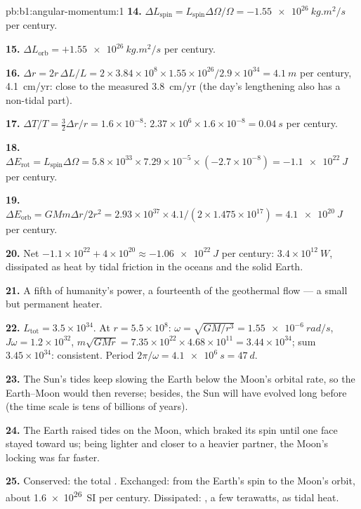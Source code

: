 \begin{solution}{pb:b1:angular-momentum:1}
\textbf{14.} $\Delta L_{\text{spin}} = L_{\text{spin}}\Delta\Omega/\Omega =
\qty{-1.55e26}{kg.m^2/s}$ per century.

\textbf{15.} $\Delta L_{\text{orb}} = +\qty{1.55e26}{kg.m^2/s}$ per century.

\textbf{16.} $\Delta r = 2r\,\Delta L/L = 2 \times 3.84\times10^8 \times 1.55
\times10^{26}/2.9\times10^{34} = \qty{4.1}{m}$ per century, \qty{4.1}{cm/yr}:
close to the measured \qty{3.8}{cm/yr} (the day's lengthening also has
a non-tidal part).

\textbf{17.} $\Delta T/T = \tfrac32\Delta r/r = 1.6\times10^{-8}$: $2.37\times
10^6 \times 1.6\times10^{-8} = \qty{0.04}{s}$ per century.

\textbf{18.} $\Delta E_{\text{rot}} = L_{\text{spin}}\Delta\Omega = 5.8\times10^{33}
\times 7.29\times10^{-5} \times (-2.7\times10^{-8}) = \qty{-1.1e22}{J}$ per
century.

\textbf{19.} $\Delta E_{\text{orb}} = GMm\Delta r/2r^2 = 2.93\times10^{37}
\times 4.1/(2 \times 1.475\times10^{17}) = \qty{+4.1e20}{J}$ per century.

\textbf{20.} Net $-1.1\times10^{22} + 4\times10^{20} \approx \qty{-1.06e22}{J}$
per century: $3.4\times10^{12}\ \unit{W}$, dissipated as heat by tidal
friction in the oceans and the solid Earth.

\textbf{21.} A fifth of humanity's power, a fourteenth of the geothermal
flow --- a small but permanent heater.

\textbf{22.} $L_{\text{tot}} = 3.5\times10^{34}$. At $r = 5.5\times10^8$:
$\omega = \sqrt{GM/r^3} = \qty{1.55e-6}{rad/s}$, $J\omega = 1.2\times10^{32}$,
$m\sqrt{GMr} = 7.35\times10^{22} \times 4.68\times10^{11} = 3.44\times10^{34}$;
sum $3.45\times10^{34}$: consistent. Period $2\pi/\omega = \qty{4.1e6}{s}
= \qty{47}{d}$.

\textbf{23.} The Sun's tides keep slowing the Earth below the Moon's
orbital rate, so the Earth--Moon  would then reverse; besides,
the Sun will have evolved long before (the time scale is tens of
billions of years).

\textbf{24.} The Earth raised tides on the Moon, which braked its spin
until one face stayed toward us; being lighter and closer to a heavier
partner, the Moon's locking was far faster.

\textbf{25.} Conserved: the total . Exchanged:  from the Earth's spin to the Moon's orbit, about \qty{1.6e26}{SI}
per century. Dissipated: , a few terawatts, as tidal
heat.
\end{solution}
